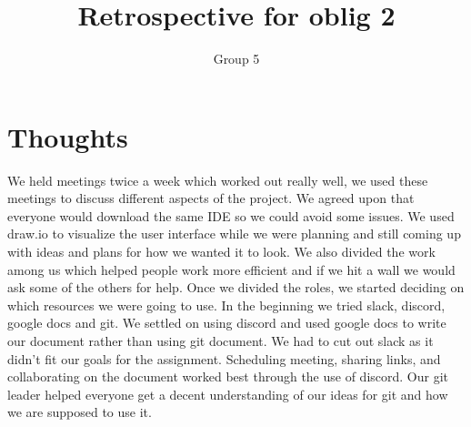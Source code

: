\documentclass{article}
\title{Retrospective for oblig 2}
\author{Group 5}
\date{}
\begin{document}
    \maketitle
    
    \section{Thoughts}
    \noindent
    We held meetings twice a week which worked out really well, we used these meetings to discuss different aspects of the project. We agreed upon that everyone would download the same IDE so we could avoid some issues. We used draw.io to visualize the user interface while we were planning and still coming up with ideas and plans for how we wanted it to look. We also divided the work among us which helped people work more efficient and if we hit a wall we would ask some of the others for help. Once we divided the roles, we started deciding on which resources we were going to use. In the beginning we tried slack, discord, google docs and git. We settled on using discord and used google docs to write our document rather than using git document. We had to cut out slack as it didn’t fit our goals for the assignment. Scheduling meeting, sharing links, and collaborating on the document worked best through the use of discord. Our git leader helped everyone get a decent understanding of our ideas for git and how we are supposed to use it. 
\end{document}
